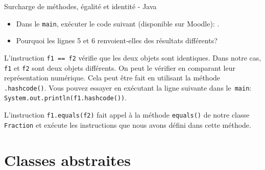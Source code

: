 \begin{Exercice}[30 minutes]{Surcharge de méthodes, égalité et identité - Java}
\begin{itemize}
	\begin{conseil}
		En Java, pour vérifier que deux objets sont de même type, vous pouvez accéder à la classe de chacun des éléments en utilisant la méthode \lstinline{.getClass())} et les comparer.
	\end{conseil}
	\item Dans le \lstinline{main}, exécuter le code suivant (disponible sur Moodle): 
	.
	\item Pourquoi les lignes 5 et 6 renvoient-elles des résultats différents?	
\end{itemize}

\begin{solution}
	

	L'instruction \lstinline{f1 == f2} vérifie que les deux objets sont identiques. Dans notre cas, \lstinline{f1} et \lstinline{f2} sont deux objets différents. On peut le vérifier en comparant leur représentation numérique. Cela peut être fait en utilisant la méthode \lstinline{.hashcode()}. Vous pouvez essayer en exécutant la ligne suivante dans le~\lstinline{main}: \lstinline{System.out.println(f1.hashcode())}.

	L'instruction \lstinline{f1.equals(f2)} fait appel à la méthode \lstinline{equals()} de notre classe \lstinline{Fraction} et exécute les instructions que nous avons défini dans cette méthode.
\end{solution}





\end{Exercice}
	

\section{Classes abstraites}

